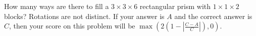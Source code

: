 How many ways are there to fill a $3\times3\times6$ rectangular prism with $1\times1\times2$ blocks? Rotations are not distinct. If your answer is $A$ and the correct answer is $C$, then your score on this problem will be $\max\left(2\left(1-\left|\frac{C-A}{C}\right|\right),0\right)$.